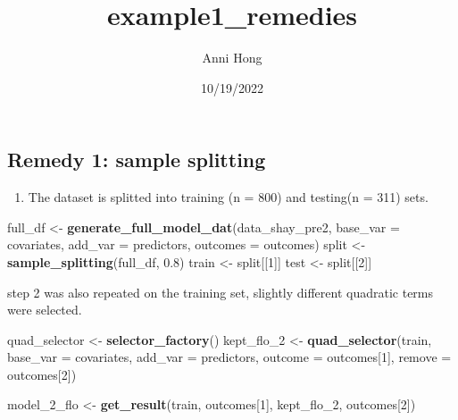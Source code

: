 \documentclass[
]{article}
\title{example1\_remedies}
\author{Anni Hong}
\date{10/19/2022}
\newenvironment{Shaded}{\begin{snugshade}}{\end{snugshade}}
\newcommand{\DataTypeTok}[1]{\textcolor[rgb]{0.13,0.29,0.53}{#1}}
\newcommand{\DecValTok}[1]{\textcolor[rgb]{0.00,0.00,0.81}{#1}}
\newcommand{\FloatTok}[1]{\textcolor[rgb]{0.00,0.00,0.81}{#1}}
\newcommand{\KeywordTok}[1]{\textcolor[rgb]{0.13,0.29,0.53}{\textbf{#1}}}
\newcommand{\NormalTok}[1]{#1}
\newcommand{\StringTok}[1]{\textcolor[rgb]{0.31,0.60,0.02}{#1}}
\providecommand{\tightlist}{%
  \setlength{\itemsep}{0pt}\setlength{\parskip}{0pt}}
\begin{document}
\maketitle

\hypertarget{remedy-1-sample-splitting}{%
\subsection{Remedy 1: sample
splitting}\label{remedy-1-sample-splitting}}

\begin{enumerate}
\def\labelenumi{\arabic{enumi}.}
\tightlist
\item
  The dataset is splitted into training (n = 800) and testing(n = 311)
  sets.
\end{enumerate}

\begin{Shaded}
\begin{Highlighting}[]
\NormalTok{full_df <-}\StringTok{ }\KeywordTok{generate_full_model_dat}\NormalTok{(data_shay_pre2, }\DataTypeTok{base_var =}\NormalTok{ covariates, }\DataTypeTok{add_var =}\NormalTok{ predictors, }\DataTypeTok{outcomes =}\NormalTok{ outcomes)}
\NormalTok{split <-}\StringTok{ }\KeywordTok{sample_splitting}\NormalTok{(full_df, }\FloatTok{0.8}\NormalTok{)}
\NormalTok{train <-}\StringTok{ }\NormalTok{split[[}\DecValTok{1}\NormalTok{]]}
\NormalTok{test <-}\StringTok{ }\NormalTok{split[[}\DecValTok{2}\NormalTok{]]}
\end{Highlighting}
\end{Shaded}

step 2 was also repeated on the training set, slightly different
quadratic terms were selected.

\begin{Shaded}
\begin{Highlighting}[]
\NormalTok{quad_selector <-}\StringTok{ }\KeywordTok{selector_factory}\NormalTok{()}
\NormalTok{kept_flo_}\DecValTok{2}\NormalTok{ <-}\StringTok{ }\KeywordTok{quad_selector}\NormalTok{(train, }\DataTypeTok{base_var =}\NormalTok{ covariates, }\DataTypeTok{add_var =}\NormalTok{ predictors, }\DataTypeTok{outcome =}\NormalTok{ outcomes[}\DecValTok{1}\NormalTok{], }\DataTypeTok{remove =}\NormalTok{ outcomes[}\DecValTok{2}\NormalTok{])}

\NormalTok{model_}\DecValTok{2}\NormalTok{_flo <-}\StringTok{ }\KeywordTok{get_result}\NormalTok{(train, outcomes[}\DecValTok{1}\NormalTok{], kept_flo_}\DecValTok{2}\NormalTok{, outcomes[}\DecValTok{2}\NormalTok{])}
\end{Highlighting}
\end{Shaded}
\end{document}
